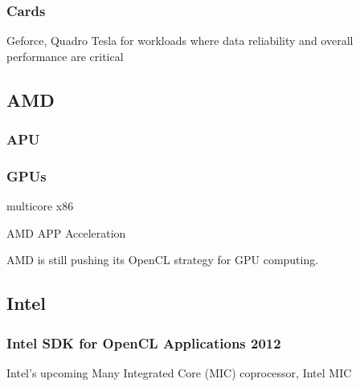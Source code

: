 \subsubsection{Cards}
Geforce, Quadro
Tesla for workloads where data reliability and overall performance are critical 

\subsection{AMD}
\subsubsection{APU}
\subsubsection{GPUs}
multicore x86


AMD APP Acceleration 


AMD is still pushing its OpenCL strategy for GPU computing. 

\subsection{Intel}
\subsubsection{Intel SDK for OpenCL Applications 2012}

Intel's upcoming Many Integrated Core (MIC) coprocessor, Intel MIC
